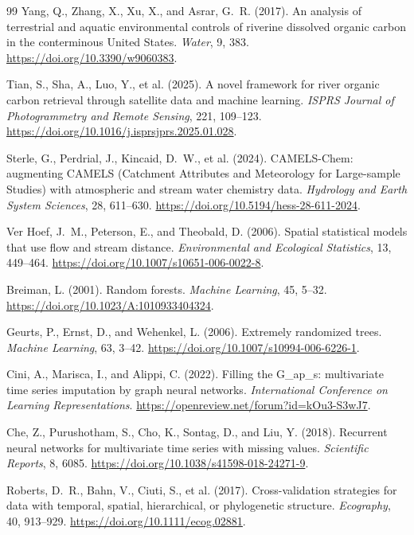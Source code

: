 \documentclass[11pt]{article}
\begin{document}
\FloatBarrier
\begin{thebibliography}{99}
Yang, Q., Zhang, X., Xu, X., and Asrar, G.~R. (2017).
An analysis of terrestrial and aquatic environmental controls of riverine dissolved organic carbon in the conterminous United States.
\emph{Water}, 9, 383.
\url{https://doi.org/10.3390/w9060383}.

Tian, S., Sha, A., Luo, Y., et al. (2025).
A novel framework for river organic carbon retrieval through satellite data and machine learning.
\emph{ISPRS Journal of Photogrammetry and Remote Sensing}, 221, 109--123.
\url{https://doi.org/10.1016/j.isprsjprs.2025.01.028}.

Sterle, G., Perdrial, J., Kincaid, D.~W., et al. (2024).
CAMELS-Chem: augmenting CAMELS (Catchment Attributes and Meteorology for Large-sample Studies) with atmospheric and stream water chemistry data.
\emph{Hydrology and Earth System Sciences}, 28, 611--630.
\url{https://doi.org/10.5194/hess-28-611-2024}.

Ver Hoef, J.~M., Peterson, E., and Theobald, D. (2006).
Spatial statistical models that use flow and stream distance.
\emph{Environmental and Ecological Statistics}, 13, 449--464.
\url{https://doi.org/10.1007/s10651-006-0022-8}.

Breiman, L. (2001).
Random forests.
\emph{Machine Learning}, 45, 5--32.
\url{https://doi.org/10.1023/A:1010933404324}.

Geurts, P., Ernst, D., and Wehenkel, L. (2006).
Extremely randomized trees.
\emph{Machine Learning}, 63, 3--42.
\url{https://doi.org/10.1007/s10994-006-6226-1}.

Cini, A., Marisca, I., and Alippi, C. (2022).
Filling the G\_ap\_s: multivariate time series imputation by graph neural networks.
\emph{International Conference on Learning Representations}.
\url{https://openreview.net/forum?id=kOu3-S3wJ7}.

Che, Z., Purushotham, S., Cho, K., Sontag, D., and Liu, Y. (2018).
Recurrent neural networks for multivariate time series with missing values.
\emph{Scientific Reports}, 8, 6085.
\url{https://doi.org/10.1038/s41598-018-24271-9}.

Roberts, D.~R., Bahn, V., Ciuti, S., et al. (2017).
Cross-validation strategies for data with temporal, spatial, hierarchical, or phylogenetic structure.
\emph{Ecography}, 40, 913--929.
\url{https://doi.org/10.1111/ecog.02881}.
\end{thebibliography}
\end{document}
